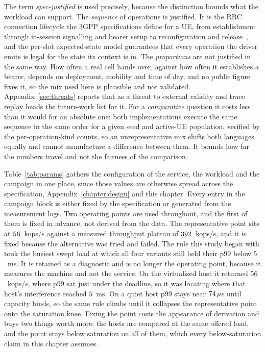 \documentclass[english,oneside,a4paper,censored,csm,software-track-2020]{HYthesisML}
\begin{document}
The term \emph{spec-justified} is used precisely, because the distinction bounds what the
workload can support. The \emph{sequence} of operations is justified. It is the RRC connection
lifecycle the 3GPP specifications define for a UE, from establishment through in-session
signalling and bearer setup to reconfiguration and release~\cite{3gpp38401,3gpp38331}, and the
per-slot expected-state model guarantees that every operation the driver emits is legal for the
state its context is in. The \emph{proportions} are not justified in the same way. How often a
real cell hands over, against how often it establishes a bearer, depends on deployment, mobility
and time of day, and no public figure fixes it, so the mix used here is plausible and not
validated. Appendix~\ref{sec:threats} reports that as a threat to external validity and trace
replay heads the future-work list for it. For a \emph{comparative} question it costs less than it
would for an absolute one: both implementations execute the same sequence in the same order for a
given seed and active-UE population, verified by the per-operation-kind counts, so an
unrepresentative mix shifts both languages equally and cannot manufacture a difference between
them. It bounds how far the numbers travel and not the fairness of the comparison.

Table~\ref{tab:params} gathers the configuration of the service, the workload and the campaign in
one place, since those values are otherwise spread across the specification,
Appendix~\ref{chapter:design} and this chapter. Every entry in the campaign block is either fixed
by the specification or generated from the measurement logs. Two operating points are used
throughout, and the first of them is fixed in advance, not derived from the data. The
representative point sits at
$56$~kops/s against a measured throughput plateau of $392$~kops/s, and it is fixed
because the alternative was tried and failed. The rule this study began with took the busiest
swept load at which all four variants still held their p99 below $5$~ms. It is retained as a
diagnostic and is no longer the operating point, because it measures the machine and not the
service. On the virtualised host it returned $56$~kops/s, where p99 sat just under
the deadline, so it was locating where that host's interference reached $5$~ms. On a quiet host
p99 stays near $74\,\mu$s until capacity binds, so the same rule climbs until
it collapses the representative point onto the saturation knee. Fixing the point costs the
appearance of derivation and buys two things worth more: the hosts are compared at the same
offered load, and the point stays below saturation on all of them, which every below-saturation
claim in this chapter assumes.
\end{document}
